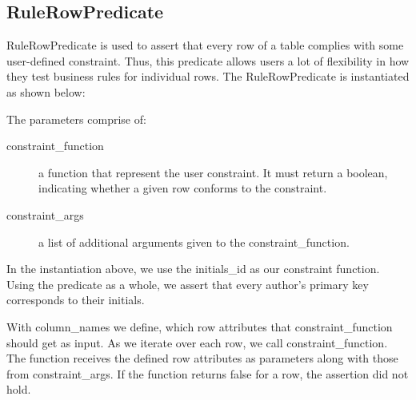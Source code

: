 \subsection{RuleRowPredicate}\label{RCP}
RuleRowPredicate is used to assert that every row of a table complies with some user-defined constraint. Thus, this predicate allows users a lot of flexibility in how they test business rules for individual rows. The RuleRowPredicate is instantiated as shown below:


The parameters comprise of:
\begin{description}
\item [constraint\_function] a function that represent the user constraint. It must return a boolean, indicating whether a given row conforms to the constraint.
\item [constraint\_args] a list of additional arguments given to the constraint\_function.
\end{description}

In the instantiation above, we use the initials\_id as our constraint function. Using the predicate as a whole, we assert that every author's primary key corresponds to their initials. 

With column\_names we define, which row attributes that constraint\_function should get as input. As we iterate over each row, we call constraint\_function. The function receives the defined row attributes as parameters along with those from constraint\_args. If the function returns false for a row, the assertion did not hold.

